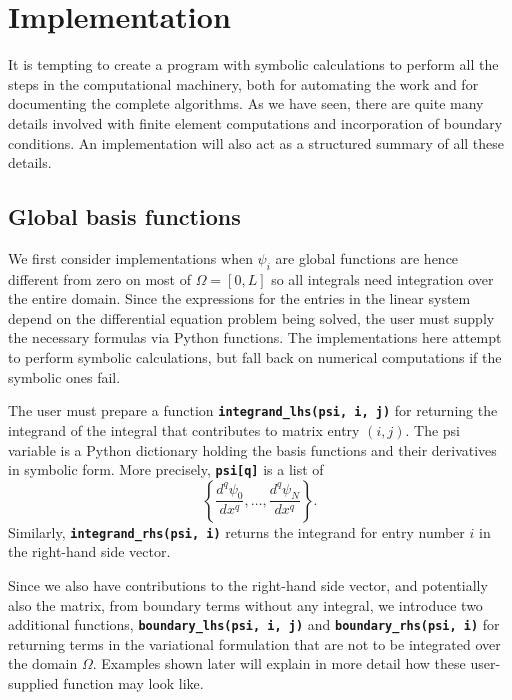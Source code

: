 \documentclass[../main.tex]{subfiles}
\begin{document}
	
		\chapter{Implementation}
\label{chap:chap_16}

\noindent It is tempting to create a program with symbolic calculations to perform all the steps in the computational machinery, both for automating the work and for documenting the complete algorithms. As we have seen, there are quite many details involved with finite element computations and incorporation of boundary conditions. An implementation will also act as a structured summary of all these details.

	\section[Implementation]{Global basis functions}
		\label{sec:sec_16_1}
		\noindent We first consider implementations when $\psi_{i}$ are global functions are hence different from zero on most of $\Omega=[0, L]$ so all integrals need integration over the entire domain. Since the expressions for the entries in the linear system depend on the differential equation problem being solved, the user must supply the necessary formulas via Python functions. The implementations here attempt to perform symbolic calculations, but fall back on numerical computations if the symbolic ones fail.
		
		The user must prepare a function \textbf{\texttt{integrand\_lhs(psi, i, j)}} for returning the integrand of the integral that contributes to matrix entry $(i, j)$. The psi variable is a Python dictionary holding the basis functions and their derivatives in symbolic form. More precisely, \textbf{\texttt{psi[q]}} is a list of
		$$
		\left\{\frac{d^{q} \psi_{0}}{d x^{q}}, \ldots, \frac{d^{q} \psi_{N}}{d x^{q}}\right\} .
		$$
		Similarly, \textbf{\texttt{integrand\_rhs(psi, i)}} returns the integrand for entry number $i$ in the right-hand side vector.
		
		Since we also have contributions to the right-hand side vector, and potentially also the matrix, from boundary terms without any integral, we introduce two additional functions, \textbf{\texttt{boundary\_lhs(psi, i, j)}} and \textbf{\texttt{boundary\_rhs(psi, i)}} for returning terms in the variational formulation that are not to be integrated over the domain $\Omega$. Examples shown later will explain in more detail how these user-supplied function may look like.
		
\end{document}
